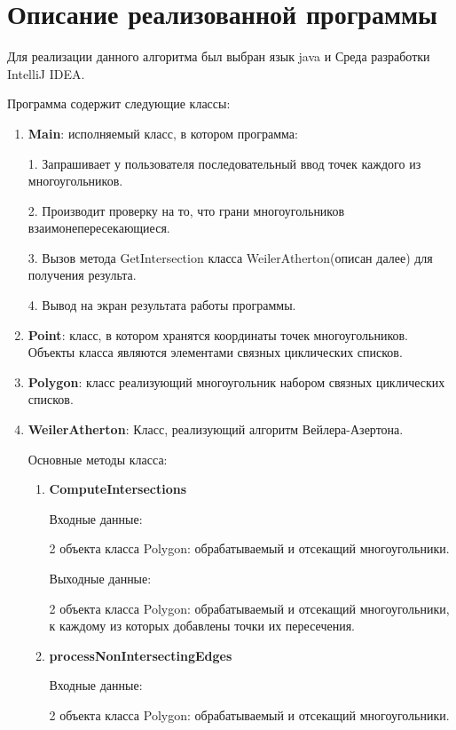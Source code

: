 \documentclass[12pt]{article}
\begin{document}
\newpage
\section{Описание реализованной программы}

Для реализации данного алгоритма был выбран язык java и Среда разработки IntelliJ IDEA.

Программа содержит следующие классы:
\begin{enumerate}
\item { \bf Main}: исполняемый класс, в котором программа:

1. Запрашивает у пользователя последовательный ввод точек каждого из многоугольников.

2. Производит проверку на то, что грани многоугольников взаимонепересекающиеся.

3. Вызов метода GetIntersection класса WeilerAtherton(описан далее) для получения результа.

4. Вывод на экран результата работы программы.


\item { \bf Point}: класс, в котором хранятся координаты точек многоугольников. Объекты класса являются элементами связных циклических списков.


\item { \bf Polygon}: класс реализующий многоугольник набором связных циклических списков.

\item { \bf WeilerAtherton}: Класс, реализующий алгоритм Вейлера-Азертона.

Основные методы класса:

\begin{enumerate}
\item { \bf ComputeIntersections}

Входные данные:

2 объекта класса Polygon: обрабатываемый и отсекащий многоугольники. 

Выходные данные: 

2 объекта класса Polygon: обрабатываемый и отсекащий многоугольники, к каждому из которых добавлены точки их пересечения.



\item { \bf processNonIntersectingEdges}

Входные данные:

2 объекта класса Polygon: обрабатываемый и отсекащий многоугольники. 


\end{enumerate}
\end{enumerate}
\end{document}
